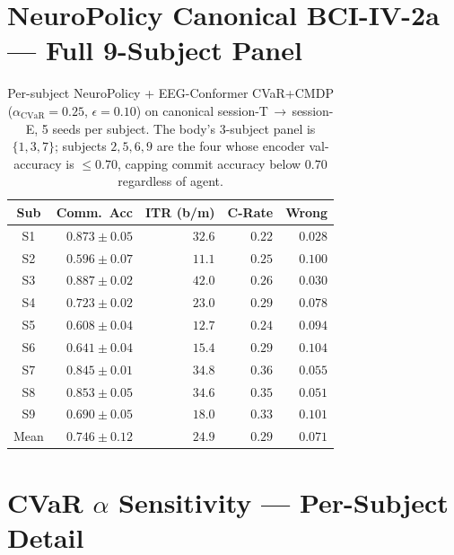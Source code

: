 \documentclass[conference]{IEEEtran}
\newcommand{\bcia}{BCI-IV-2a}
\newcommand{\cvar}{\mathrm{CVaR}}
\begin{document}
\section{NeuroPolicy Canonical \bcia{} --- Full 9-Subject Panel}\label{app:9subj}

\begin{table}[H]
\centering
\caption{Per-subject NeuroPolicy + EEG-Conformer CVaR+CMDP
($\alpha_{\cvar}\!=\!0.25$, $\epsilon\!=\!0.10$) on canonical
session-T\,$\to$\,session-E, 5 seeds per subject. The body's
3-subject panel is $\{1, 3, 7\}$; subjects $2, 5, 6, 9$ are the
four whose encoder val-accuracy is $\le 0.70$, capping commit
accuracy below $0.70$ regardless of agent.}
\label{tab:app:9subj}
\footnotesize
\setlength{\tabcolsep}{3pt}
\begin{tabular}{c r r r r}
\toprule
Sub & Comm.~Acc & ITR (b/m) & C-Rate & Wrong \\
\midrule
S1  & $0.873 \pm 0.05$ & $32.6$ & $0.22$ & $0.028$ \\
S2  & $0.596 \pm 0.07$ & $11.1$ & $0.25$ & $0.100$ \\
S3  & $0.887 \pm 0.02$ & $42.0$ & $0.26$ & $0.030$ \\
S4  & $0.723 \pm 0.02$ & $23.0$ & $0.29$ & $0.078$ \\
S5  & $0.608 \pm 0.04$ & $12.7$ & $0.24$ & $0.094$ \\
S6  & $0.641 \pm 0.04$ & $15.4$ & $0.29$ & $0.104$ \\
S7  & $0.845 \pm 0.01$ & $34.8$ & $0.36$ & $0.055$ \\
S8  & $0.853 \pm 0.05$ & $34.6$ & $0.35$ & $0.051$ \\
S9  & $0.690 \pm 0.05$ & $18.0$ & $0.33$ & $0.101$ \\
\midrule
Mean & $0.746 \pm 0.12$ & $24.9$ & $0.29$ & $0.071$ \\
\bottomrule
\end{tabular}
\end{table}

\section{CVaR $\alpha$ Sensitivity --- Per-Subject Detail}\label{app:cvar_alpha}
\end{document}
